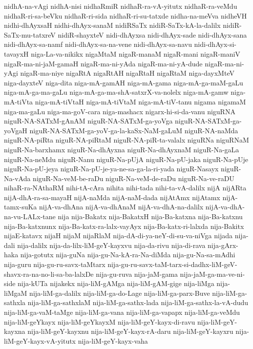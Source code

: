 {nidhA-na-vAgi
nidhA-nisi
nidhaRmiR
nidhaR-ra-vA-yitutx
nidhaR-ra-veMdu
nidhaR-ri-sa-beVku
nidhaR-ri-sida
nidhaR-ri-su-tatxde
nidha-na-meVva
nidheVH
nidhi-dhAyxsaH
nidhi-dhAyx-sanaM
nidiRSaTx
nidiR-SaTx-kA-la-dalilx
nidiR-SaTx-mu-tatxreV
nidiR-shayxteV
nidi-dhAyxsa
nidi-dhAyx-sade
nidi-dhAyx-sana
nidi-dhAyx-sa-namf
nidi-dhAyx-sa-na-vene
nidi-dhAyx-sa-navu
nidi-dhAyx-si-tavayxH
niga-La-va-nikikx
nigaMtaM
nigaR-manaM
nigaR-mani
nigaR-maniV
nigaR-ma-ni-jaM-gamaH
nigaR-ma-ni-yAda
nigaR-ma-ni-yA-dude
nigaR-ma-ni-yAgi
nigaR-ma-niye
nigaRtA
nigaRtAH
nigaRtaH
nigaRtaM
niga-dayxMteV
niga-dayxteV
niga-dita
niga-mA-gamAH
niga-mA-gama
niga-mA-ga-maM-gaLu
niga-mA-ga-ma-gaLu
niga-mA-ga-ma-shA-satxrX-va-nolelx
niga-mA-gamw
niga-mA-tiVta
niga-mA-tiVtaH
niga-mA-tiVtaM
niga-mA-tiV-tanu
nigama
nigamaM
niga-ma-gaLu
niga-ma-goV-cara
niga-mashacx
nigarx-hi-si-da-vanu
niguRNA
niguR-NA-SATxM-gAnAM
niguR-NA-SATxM-ga-yoVga
niguR-NA-SATxM-ga-yoVgaH
niguR-NA-SATxM-ga-yoV-ga-la-kaSx-NaM-gaLuM
niguR-NA-naMda
niguR-NA-piRta
niguR-NA-piRtaM
niguR-NA-piR-ta-valalx
niguRNa
niguRNaM
niguR-Na-barxhamx
niguR-Na-dhAyxna
niguR-Na-dhAyxnaM
niguR-Na-gaLa
niguR-Na-neMdu
niguR-Nanu
niguR-Na-pUjA
niguR-Na-pU-jaka
niguR-Na-pUje
niguR-Na-pU-jeya
niguR-Na-pU-je-ya-ne-sa-ga-la-ri-yada
niguR-Nasayx
niguR-Na-vAda
niguR-Na-veM-be-raDu
niguR-Na-veM-de-raDu
niguR-Na-ve-raDU
nihaR-ra-NAthaRM
nihi-tA-cAra
nihita
nihi-tada
nihi-ta-vA-dalilx
nijA
nijARta
nijA-dhA-ra-sa-mayaH
nijA-naMda
nijA-naM-dada
nijAtAmx
nijAtamx
nijA-tamx-suKa
nijA-va-dhAna
nijA-va-dhAnaM
nijA-va-dhA-na-dalilx
nijA-va-dhA-na-vu-LALx-tane
nija
nija-Bakatx
nija-BakatxH
nija-Ba-katxna
nija-Ba-katxnu
nija-Ba-katxnunx
nija-Ba-katx-ra-lalx-vayAyx
nija-Ba-katx-ri-lalxda
nija-Bakitx
nijaE-katavx
nijaH
nijaM
nijaRlaM
nija-dA-di-ya-neY-di-su-va-niVga
nijada
nija-dali
nija-dalilx
nija-da-lilx-liM-geY-kayxvu
nija-da-rivu
nija-di-rava
nija-gArx-haka
nija-gotutx
nija-guNa
nija-gu-Na-kA-ra-Na-diMda
nija-gu-Na-sa-mAdhi
nija-guru
nija-gu-ru-savx-taMtarx
nija-gu-ru-savx-taM-tarx-si-dadhx-liM-geV-shavx-ra-na-no-li-sa-ba-lalxDe
nija-gu-ruva
nija-jaM-gama
nija-jaM-ga-ma-ve-ni-side
nija-kUTa
nijakekx
nija-liM-gAMga
nija-liM-gAM-gige
nija-liMga
nija-liMgaM
nija-liM-ga-dalilx
nija-liM-ga-do-Lage
nija-liM-ga-parx-Buve
nija-liM-ga-sathxla
nija-liM-ga-sathxlaM
nija-liM-ga-sathx-lada
nija-liM-ga-sathx-la-vA-dudu
nija-liM-ga-vaM-taMge
nija-liM-ga-vana
nija-liM-ga-vapapx
nija-liM-ga-veMdu
nija-liM-geYkayx
nija-liM-geYkayxM
nija-liM-geY-kayx-di-ravu
nija-liM-geY-kayxna
nija-liM-geY-kayxnu
nija-liM-geY-kayx-rA-daru
nija-liM-geY-kayxru
nija-liM-geY-kayx-vA-yitutx
nija-liM-geY-kayx-vaha
}
